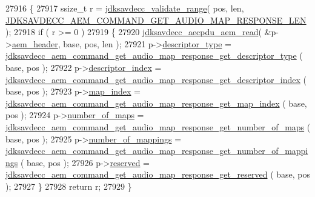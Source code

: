 \begin{DoxyCode}
27916 \{
27917     ssize\_t r = \hyperlink{group__util_ga9c02bdfe76c69163647c3196db7a73a1}{jdksavdecc\_validate\_range}( pos, len, 
      \hyperlink{group__command__get__audio__map__response_gaadc64bc783a27fb25775c7ffd1416a0f}{JDKSAVDECC\_AEM\_COMMAND\_GET\_AUDIO\_MAP\_RESPONSE\_LEN} );
27918     \textcolor{keywordflow}{if} ( r >= 0 )
27919     \{
27920         \hyperlink{group__aecpdu__aem_gae2421015dcdce745b4f03832e12b4fb6}{jdksavdecc\_aecpdu\_aem\_read}( &p->\hyperlink{structjdksavdecc__aem__command__get__audio__map__response_ae1e77ccb75ff5021ad923221eab38294}{aem\_header}, base, pos, len );
27921         p->\hyperlink{structjdksavdecc__aem__command__get__audio__map__response_ab7c32b6c7131c13d4ea3b7ee2f09b78d}{descriptor\_type} = 
      \hyperlink{group__command__get__audio__map__response_gadad3ed6c46e1496f7d1b519166e81425}{jdksavdecc\_aem\_command\_get\_audio\_map\_response\_get\_descriptor\_type}
      ( base, pos );
27922         p->\hyperlink{structjdksavdecc__aem__command__get__audio__map__response_a042bbc76d835b82d27c1932431ee38d4}{descriptor\_index} = 
      \hyperlink{group__command__get__audio__map__response_ga59110138100c2d8b54c2bb035604d6a2}{jdksavdecc\_aem\_command\_get\_audio\_map\_response\_get\_descriptor\_index}
      ( base, pos );
27923         p->\hyperlink{structjdksavdecc__aem__command__get__audio__map__response_a3a5e0547986898ad64c07f238d8b7bcf}{map\_index} = 
      \hyperlink{group__command__get__audio__map__response_ga64da102f201b88cea6fea5c801a1d8e5}{jdksavdecc\_aem\_command\_get\_audio\_map\_response\_get\_map\_index}
      ( base, pos );
27924         p->\hyperlink{structjdksavdecc__aem__command__get__audio__map__response_a6d00316ed943197ab46c0af22c1d430a}{number\_of\_maps} = 
      \hyperlink{group__command__get__audio__map__response_ga1ef895c698c0a8cee1eae241f9433af1}{jdksavdecc\_aem\_command\_get\_audio\_map\_response\_get\_number\_of\_maps}
      ( base, pos );
27925         p->\hyperlink{structjdksavdecc__aem__command__get__audio__map__response_ac7db472c5622ef473d5d0a5c416d5531}{number\_of\_mappings} = 
      \hyperlink{group__command__get__audio__map__response_gad2cadbf9180c687c17781f6038a0fe3b}{jdksavdecc\_aem\_command\_get\_audio\_map\_response\_get\_number\_of\_mappings}
      ( base, pos );
27926         p->\hyperlink{structjdksavdecc__aem__command__get__audio__map__response_a5a6ed8c04a3db86066924b1a1bf4dad3}{reserved} = 
      \hyperlink{group__command__get__audio__map__response_ga387349ea4995bb254eb007ca1092cc08}{jdksavdecc\_aem\_command\_get\_audio\_map\_response\_get\_reserved}
      ( base, pos );
27927     \}
27928     \textcolor{keywordflow}{return} r;
27929 \}
\end{DoxyCode}


